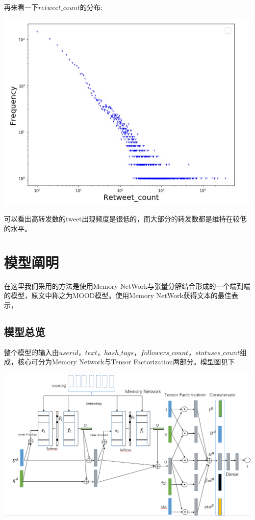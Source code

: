 \documentclass[a4paper, 12pt]{ctexart}
\begin{document}
再来看一下$retweet\_count$的分布:

\includegraphics[width=6inc]{tweet_pics/0}

可以看出高转发数的tweet出现频度是很低的，而大部分的转发数都是维持在较低的水平。

\section{模型阐明}
在这里我们采用的方法是使用Memory NetWork与张量分解结合形成的一个端到端的模型，原文中称之为MOOD模型。使用Memory NetWork获得文本的最佳表示，
\subsection{模型总览}
整个模型的输入由$userid$，$text$，$hash\_tags$，$followers\_count$，$statuses\_count$组成，核心可分为Memory Network与Tensor Factorization两部分。模型图见下

\includegraphics[width=6inc]{tweet_pics/model}
\end{document}
